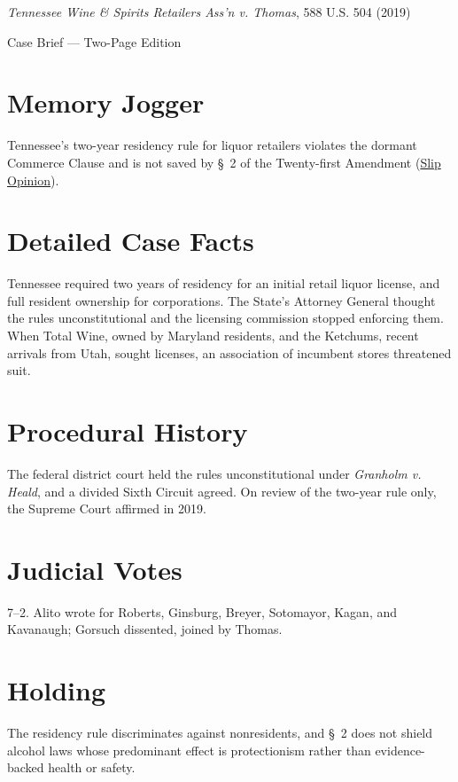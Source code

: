 \documentclass[12pt]{article}
\begin{document}
\begin{center}
{\LARGE \textit{Tennessee Wine \& Spirits Retailers Ass'n v. Thomas}, 588 U.S. 504 (2019)\par}
\vspace{0.5em}
{\large Case Brief --- Two-Page Edition\par}
\end{center}

\section{Memory Jogger}
Tennessee's two-year residency rule for liquor retailers violates the dormant Commerce Clause and is not saved by \S~2 of the Twenty-first Amendment (\href{https://www.supremecourt.gov/opinions/18pdf/18-96_5i36.pdf}{Slip Opinion}).

\section{Detailed Case Facts}
Tennessee required two years of residency for an initial retail liquor license, and full resident ownership for corporations. The State's Attorney General thought the rules unconstitutional and the licensing commission stopped enforcing them. When Total Wine, owned by Maryland residents, and the Ketchums, recent arrivals from Utah, sought licenses, an association of incumbent stores threatened suit.

\section{Procedural History}
The federal district court held the rules unconstitutional under \textit{Granholm v. Heald}, and a divided Sixth Circuit agreed. On review of the two-year rule only, the Supreme Court affirmed in 2019.

\section{Judicial Votes}
7--2. Alito wrote for Roberts, Ginsburg, Breyer, Sotomayor, Kagan, and Kavanaugh; Gorsuch dissented, joined by Thomas.

\section{Holding}
The residency rule discriminates against nonresidents, and \S~2 does not shield alcohol laws whose predominant effect is protectionism rather than evidence-backed health or safety.
\end{document}
